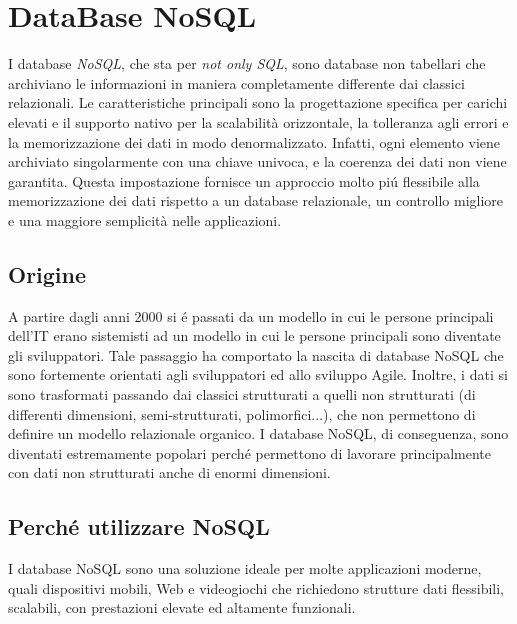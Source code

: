 \chapter{DataBase NoSQL}
I database \emph{NoSQL}, che sta per \emph{not only SQL}, sono database non tabellari che archiviano le informazioni
in maniera completamente differente dai classici relazionali.
Le caratteristiche principali sono la progettazione specifica per carichi elevati e il supporto nativo per la scalabilità
orizzontale, la tolleranza agli errori e la memorizzazione dei dati in modo denormalizzato.
Infatti, ogni elemento viene archiviato singolarmente con una chiave univoca, e la coerenza dei dati non viene garantita.
Questa impostazione fornisce un approccio molto piú flessibile alla memorizzazione dei dati rispetto a un database
relazionale, un controllo migliore e una maggiore semplicità nelle applicazioni.

\section{Origine}
A partire dagli anni 2000 si é passati da un modello in cui le persone principali dell'IT erano sistemisti ad un modello
in cui le persone principali sono diventate gli sviluppatori. Tale passaggio ha comportato la nascita di database NoSQL
che sono fortemente orientati agli sviluppatori ed allo sviluppo Agile.
Inoltre, i dati si sono trasformati passando dai classici strutturati a quelli non strutturati (di differenti dimensioni,
semi-strutturati, polimorfici...), che non permettono di definire un modello relazionale organico.
I database NoSQL, di conseguenza, sono diventati estremamente popolari perché permettono di lavorare principalmente con dati non strutturati anche di enormi
dimensioni.

\section{Perché utilizzare NoSQL}
I database NoSQL sono una soluzione ideale per molte applicazioni moderne, quali dispositivi mobili, Web e videogiochi
che richiedono strutture dati flessibili, scalabili, con prestazioni elevate ed altamente funzionali.
